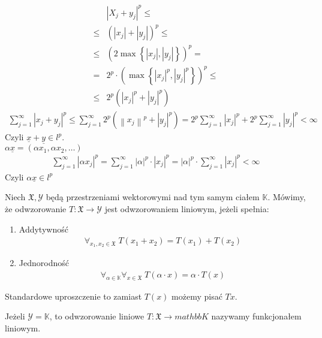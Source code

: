 \begin{align*}
&\left|X_j+y_j\right|^p
\le\\\le&
\left(\left|x_j\right|+\left|y_j\right|\right)^p
\le\\\le&
\left(2\max \left\{\left|x_j\right|,\left|y_j\right|\right\}\right)^p
=\\=&
2^p\cdot \left(\max \left\{\left|x_j\right|^p,\left|y_j\right|^p\right\}\right)^p
\le\\\le&
2^p\left(\left|x_j\right|^p+\left|y_j\right|^p\right)
\end{align*}
\begin{gather*}
\sum_{j=1}^{\infty }\left|x_j+y_j\right|^p\le
\sum_{j=1}^{\infty }2^p\left(\left\|x_j\right\|^p+\left|y_j\right|^p\right)=
2^p\sum_{j=1}^{\infty }\left|x_j\right|^p+
2^p\sum_{j=1}^{\infty }\left|y_j\right|^p<\infty 
\end{gather*}
Czyli $ \underline x+\underline y\in l^p $.\\
$ \alpha \underline x=\left(\alpha x_1,\alpha x_2,\dots \right) $
\begin{gather*}
\sum_{j=1}^{\infty }\left|\alpha x_j\right|^p=
\sum_{j=1}^{\infty }\left|\alpha\right|^p\cdot\left|x_j\right|^p=
\left|\alpha\right|^p\cdot\sum_{j=1}^{\infty }\left|x_j\right|^p<\infty 
\end{gather*}
Czyli $ \alpha \underline x\in l^p $
\begin{defi}
Niech $ \mathfrak X,\mathcal Y $ będą przestrzeniami wektorowymi nad tym samym ciałem $ \mathbb K $. Mówimy, że odwzorowanie $ T:\mathfrak X\to \mathcal Y $ jest odwzorowaniem liniowym, jeżeli spełnia:
\begin{enumerate}
\item Addytywność
\begin{gather*}
\forall_{x_1,x_2\in\mathfrak X}\; T(x_1+x_2)=T(x_1)+T(x_2)
\end{gather*}
\item Jednorodność
\begin{gather*}
\forall_{\alpha\in\mathbb K}\forall_{x\in\mathfrak X}\; T(\alpha\cdot x)=\alpha\cdot T(x)
\end{gather*}
\end{enumerate}
\end{defi}
Standardowe uproszczenie to zamiast $ T(x) $ możemy pisać $ Tx $.
\begin{defi}
Jeżeli $ \mathcal Y=\mathbb K $, to odwzorowanie liniowe $ T:\mathfrak X\to mathbb K $  nazywamy funkcjonałem liniowym.
\end{defi}
